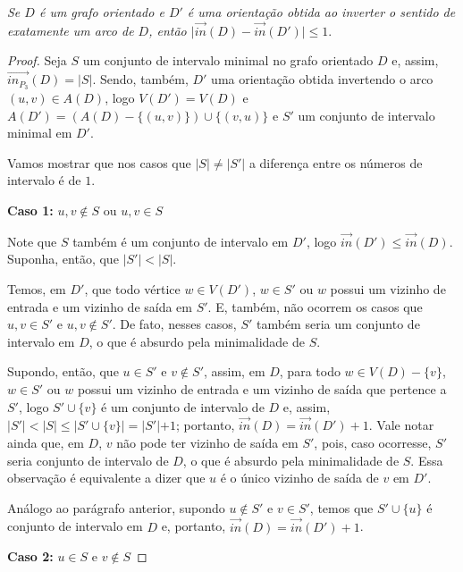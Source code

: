 \begin{lemma}
    \textit{Se $D$ é um grafo orientado e $D'$ é uma orientação obtida ao inverter o sentido de exatamente um arco de $D$, então $\lvert \overrightarrow{in}(D) - \overrightarrow{in}(D') \lvert \leq 1$}.\label{lem:inv}
    
\end{lemma}
\begin{proof}
    Seja $S$ um conjunto de intervalo minimal no grafo orientado $D$ e, assim, $\overrightarrow{in_{P_3}}(D)=\lvert S \lvert$. Sendo, também, $D'$ uma orientação obtida invertendo o arco $(u,v)\in A(D)$, logo $V(D')=V(D)$ e $A(D')=(A(D)-\{ (u,v) \})\cup \{ (v,u) \}$ e $S'$ um conjunto de intervalo minimal em $D'$.

    Vamos mostrar que nos casos que $\lvert S\lvert \neq \lvert S'\lvert$ a diferença entre os números de intervalo é de $1$.
    
    \noindent \textbf{Caso 1:} $u,v \notin S$ ou $u,v \in S$

    Note que $S$ também é um conjunto de intervalo em $D'$, logo $\overrightarrow{in}(D') \leq \overrightarrow{in}(D)$. Suponha, então, que $\lvert S'\lvert < \lvert S \lvert$. 

    Temos, em $D'$, que todo vértice $w\in V(D')$, $w\in S'$ ou $w$ possui um vizinho de entrada e um vizinho de saída em $S'$. E, também, não ocorrem os casos que $u,v\in S'$ e $u,v\notin S'$. De fato, nesses casos, $S'$ também seria um conjunto de intervalo em $D$, o que é absurdo pela minimalidade de $S$.
    
    Supondo, então, que $u\in S'$ e $v\notin S'$, assim, em $D$, para todo $w\in V(D)-\{ v \}$, $w\in S'$ ou $w$ possui um vizinho de entrada e um vizinho de saída que pertence a $S'$, logo $S'\cup \{ v \}$ é um conjunto de intervalo de $D$ e, assim, $\lvert S' \lvert <\lvert S\lvert \leq \lvert S' \cup \{ v \} \lvert = \lvert S'\lvert +1$; portanto, $\overrightarrow{in}(D)=\overrightarrow{in}(D') +1$. Vale notar ainda que, em $D$, $v$ não pode ter vizinho de saída em $S'$, pois, caso ocorresse, $S'$ seria conjunto de intervalo de $D$, o que é absurdo pela minimalidade de $S$. Essa observação é equivalente a dizer que $u$ é o único vizinho de saída de $v$ em $D'$.
    
    Análogo ao parágrafo anterior, supondo $u\notin S'$ e $v\in S'$, temos que $S'\cup \{ u\}$ é conjunto de intervalo em $D$ e, portanto, $\overrightarrow{in}(D)=\overrightarrow{in}(D') +1$.

    \noindent \textbf{Caso 2:} $u \in S$ e $v \notin S$


\end{proof}

